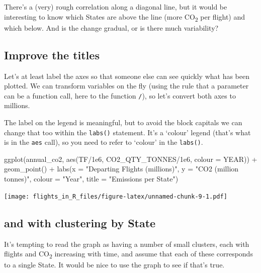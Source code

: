 \documentclass[
]{book}
\newenvironment{Shaded}{\begin{snugshade}}{\end{snugshade}}
\newcommand{\AttributeTok}[1]{\textcolor[rgb]{0.77,0.63,0.00}{#1}}
\newcommand{\FloatTok}[1]{\textcolor[rgb]{0.00,0.00,0.81}{#1}}
\newcommand{\FunctionTok}[1]{\textcolor[rgb]{0.00,0.00,0.00}{#1}}
\newcommand{\NormalTok}[1]{#1}
\newcommand{\SpecialCharTok}[1]{\textcolor[rgb]{0.00,0.00,0.00}{#1}}
\newcommand{\StringTok}[1]{\textcolor[rgb]{0.31,0.60,0.02}{#1}}
\begin{document}
There's a (very) rough correlation along a diagonal line, but it would be interesting to know which States are above the line (more CO\textsubscript{2} per flight) and which below. And is the change gradual, or is there much variability?

\hypertarget{improve-the-titles}{%
\subsection{Improve the titles}\label{improve-the-titles}}

Let's at least label the axes so that someone else can see quickly what has been plotted. We can transform variables on the fly (using the rule that a parameter can be a function call, here to the function \texttt{/}), so let's convert both axes to millions.

The label on the legend is meaningful, but to avoid the block capitals we can change that too within the \texttt{labs()} statement. It's a `colour' legend (that's what is in the \texttt{aes} call), so you need to refer to `colour' in the \texttt{labs()}.

\begin{Shaded}
\begin{Highlighting}[]
\FunctionTok{ggplot}\NormalTok{(annual\_co2, }\FunctionTok{aes}\NormalTok{(TF}\SpecialCharTok{/}\FloatTok{1e6}\NormalTok{, CO2\_QTY\_TONNES}\SpecialCharTok{/}\FloatTok{1e6}\NormalTok{, }\AttributeTok{colour =}\NormalTok{ YEAR)) }\SpecialCharTok{+}
  \FunctionTok{geom\_point}\NormalTok{() }\SpecialCharTok{+} 
  \FunctionTok{labs}\NormalTok{(}\AttributeTok{x =} \StringTok{"Departing Flights (millions)"}\NormalTok{, }
       \AttributeTok{y =} \StringTok{"CO2 (million tonnes)"}\NormalTok{,}
       \AttributeTok{colour =} \StringTok{"Year"}\NormalTok{,}
       \AttributeTok{title =} \StringTok{"Emissions per State"}\NormalTok{)}
\end{Highlighting}
\end{Shaded}

\texttt{[image: flights\_in\_R\_files/figure-latex/unnamed-chunk-9-1.pdf]}

\hypertarget{statecluster}{%
\subsection{and with clustering by State}\label{statecluster}}

It's tempting to read the graph as having a number of small clusters, each with flights and CO\textsubscript{2} increasing with time, and assume that each of these corresponds to a single State. It would be nice to use the graph to see if that's true.
\end{document}
